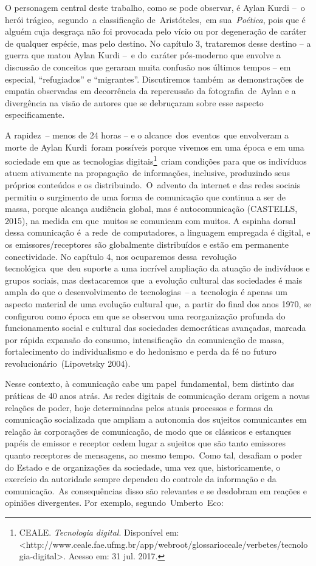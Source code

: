 \documentclass[
  letterpaper,
]{scrbook}
\begin{document}
O personagem central deste trabalho, como se pode observar, é Aylan
Kurdi --~o herói trágico,~segundo~a classificação de~Aristóteles,~em
sua~\emph{Poética}, pois que é alguém cuja desgraça não foi provocada
pelo vício ou por degeneração de caráter de qualquer espécie, mas pelo
destino. No capítulo 3, trataremos desse destino -- a guerra que matou
Aylan Kurdi --~e do~caráter pós-moderno que envolve a discussão de
conceitos que geraram muita confusão nos últimos tempos -- em especial,
``refugiados'' e ``migrantes''. Discutiremos também~as demonstrações de
empatia observadas em decorrência da repercussão da fotografia~de~Aylan
e a divergência na visão de autores que se debruçaram sobre esse aspecto
especificamente.~

A rapidez~-- menos de 24 horas -- e o alcance~dos~eventos~que envolveram
a morte de Aylan Kurdi~foram possíveis porque vivemos em uma época e em
uma sociedade em que as tecnologias digitais\footnote{CEALE.
  \emph{Tecnologia digital}. Disponível em:
  \textless http://www.ceale.fae.ufmg.br/app/webroot/glossarioceale/verbetes/tecnologia-digital\textgreater.
  Acesso em: 31 jul. 2017.}~criam condições para que os indivíduos atuem
ativamente na propagação~de informações, inclusive, produzindo seus
próprios conteúdos e os distribuindo.~O~advento da internet e das redes
sociais permitiu o surgimento de uma forma de comunicação que continua a
ser de massa, porque alcança audiência global, mas é autocomunicação
(CASTELLS, 2015), na medida em que~muitos se comunicam com muitos. A
espinha dorsal dessa comunicação é~a rede~de computadores, a linguagem
empregada é digital, e os emissores/receptores são globalmente
distribuídos e estão em permanente conectividade. No capítulo 4, nos
ocuparemos dessa~revolução tecnológica~que~deu suporte a uma incrível
ampliação da atuação de indivíduos e grupos sociais, mas destacaremos
que~a evolução cultural das sociedades é mais ampla do que o
desenvolvimento de tecnologias~-- a~tecnologia é apenas um aspecto
material de uma evolução cultural que,~a partir do final dos anos 1970,
se configurou como época em que se observou uma reorganização profunda
do funcionamento social e cultural das sociedades democráticas
avançadas, marcada por rápida expansão do consumo, intensificação~da
comunicação de massa, fortalecimento do individualismo e do hedonismo e
perda da fé no futuro revolucionário~(Lipovetsky 2004).~

Nesse contexto, à comunicação cabe um papel~fundamental, bem distinto
das práticas de 40 anos atrás. As redes digitais de comunicação deram
origem a novas relações de poder, hoje determinadas pelos atuais
processos e formas da comunicação socializada que ampliam a autonomia
dos sujeitos comunicantes em relação às corporações de comunicação, de
modo que os clássicos e estanques papéis de emissor e receptor cedem
lugar a sujeitos que são tanto emissores quanto receptores de mensagens,
ao mesmo tempo.~Como tal, desafiam o poder do Estado e de organizações
da sociedade, uma vez que, historicamente, o exercício da autoridade
sempre dependeu do controle da informação e da comunicação.~As
consequências disso são relevantes e se desdobram em reações e opiniões
divergentes. Por exemplo, segundo~Umberto~Eco:~
\end{document}
